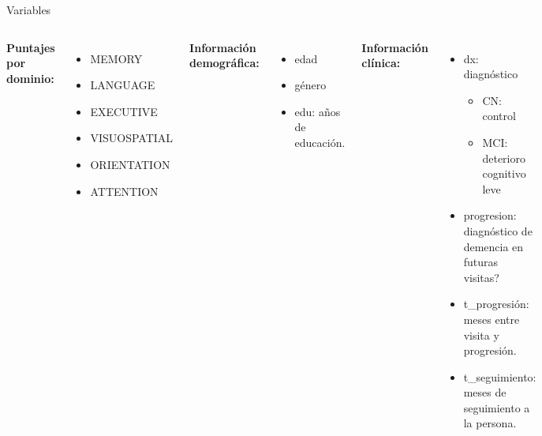 \documentclass[10pt, aspectratio=169]{beamer}
\begin{document}
\begin{frame}[fragile]{Variables}
 \begin{columns}[T]
  \textcolor{PinkPeacock}{\textbf{Puntajes por dominio:}}
  \begin{itemize}
   \item MEMORY
   \item LANGUAGE
   \item EXECUTIVE
   \item VISUOSPATIAL
   \item ORIENTATION
   \item ATTENTION
  \end{itemize}
  \textcolor{BlueMoon}{\textbf{Información demográfica:}}
  \begin{itemize}
   \item edad
   \item género
   \item edu: años de educación.
  \end{itemize}
  \textcolor{SparklingGrape}{\textbf{Información clínica:}}
  \begin{itemize}
   \item dx: diagnóstico
   \begin{itemize}
    \item CN: control
    \item MCI: deterioro cognitivo leve
   \end{itemize}
   \item progresion: diagnóstico de demencia en futuras visitas?
   \item t\_progresión: meses entre visita y progresión.
   \item t\_seguimiento: meses de seguimiento a la persona.
  \end{itemize}
 \end{columns}
\end{frame}
\end{document}
